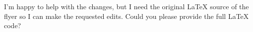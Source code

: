 I’m happy to help with the changes, but I need the original LaTeX source of the flyer so I can make the requested edits. Could you please provide the full LaTeX code?